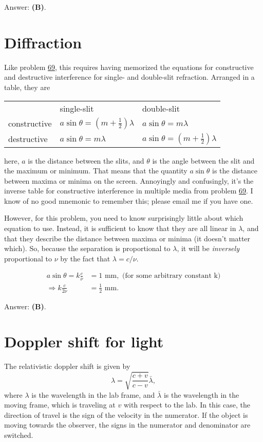 \documentclass[11pt]{paper}
\newcommand{\answer}[1]{Answer: \textbf{(#1)}.}
\begin{document}
\answer{B}

\section{Diffraction}
Like problem \hyperlink{section.69}{69}, this requires having memorized the equations for constructive and destructive interference for single- and double-slit refraction.  Arranged in a table, they are
\begin{table}[h]
\centering
\bgroup
\def\arraystretch{1.5}
\begin{tabular}{lll}
                                  & single-slit  & double-slit    \\ \cline{2-3} 
\multicolumn{1}{l|}{constructive} & \multicolumn{1}{l|}{$a\sin{\theta} = (m+\frac{1}{2})\lambda$} & \multicolumn{1}{l|}{$a\sin{\theta} = m\lambda$} \\ \cline{2-3} 
\multicolumn{1}{l|}{destructive}  & \multicolumn{1}{l|}{$a\sin{\theta} = m\lambda$} & \multicolumn{1}{l|}{$a\sin{\theta} = \left(m+\frac{1}{2}\right)\lambda$} \\ \cline{2-3} 
\end{tabular}
\egroup
\end{table}

here, $a$ is the distance between the slits, and $\theta$ is the angle between the slit and the maximum or minimum.  That means that the quantity $a\sin{\theta}$ is the distance between maxima or minima on the screen. Annoyingly and confusingly, it's the inverse table for constructive interference in multiple media from problem \hyperlink{section.69}{69}.  I know of no good mnemonic to remember this; please email me if you have one.

However, for this problem, you need to know surprisingly little about which equation to use.  Instead, it is sufficient to know that they are all linear in $\lambda$, and that they describe the distance between maxima or minima (it doesn't matter which).  So, because the separation is proportional to $\lambda$, it will be \emph{inversely} proportional to $\nu$ by the fact that $\lambda = c/\nu$.

\begin{align}
a\sin{\theta}  = k\frac{c}{\nu} &= 1\text{ mm}, \text{ (for some arbitrary constant k)}\\
\Rightarrow k\frac{c}{2\nu} &= \frac{1}{2}\text{ mm}.
\end{align}

\answer{B}

\section{Doppler shift for light}
The relativistic doppler shift is given by
\begin{equation}
\lambda = \sqrt{\frac{c+v}{c-v}}\bar{\lambda},
\end{equation}
where $\lambda$ is the wavelength in the lab frame, and $\bar{\lambda}$ is the wavelength in the moving frame, which is traveling at $v$ with respect to the lab.  In this case, the direction of travel is the sign of the velocity in the numerator.  If the object is moving towards the observer, the signs in the numerator and denominator are switched.
\end{document}
